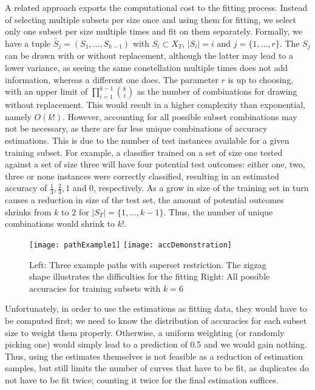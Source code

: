 A related approach exports the computational cost to the fitting process. Instead of selecting multiple subsets per size once and using them for fitting, we select only one subset per size multiple times and fit on them separately. Formally, we have a tuple $\tilde{S_j} = (S_1,...,S_{k-1})$ with $S_i \subset X_T$, $|S_i| = i$ and $j = \{1,...,r\}$. The $S_j$ can be drawn with or without replacement, although the latter may lead to a lower variance, as seeing the same constellation multiple times does not add information, whereas a different one does. The parameter $r$ is up to choosing, with an upper limit of $\prod_{i=1}^{k-1} {k \choose i}$ as the number of combinations for drawing without replacement. This would result in a higher complexity than exponential, namely $O(k!)$. However, accounting for all possible subset combinations may not be necessary, as there are far less unique combinations of accuracy estimations. This is due to the number of test instances available for a given training subset. For example, a classifier trained on a set of size one tested against a set of size three will have four potential test outcomes: either one, two, three or none instances were correctly classified, resulting in an estimated accuracy of $\frac{1}{3}, \frac{2}{3}, 1$ and $0$, respectively. As a grow in size of the training set in turn causes a reduction in size of the test set, the amount of potential outcomes shrinks from $k$ to $2$ for $|S_T| = \{1, ..., k-1\}$. Thus, the number of unique combinations would shrink to $k!$.

\begin{figure}[h]
	\centering
	\texttt{[image: pathExample1]}
	\texttt{[image: accDemonstration]}
	\caption{Left: Three example paths with superset restriction. The zigzag shape illustrates the difficulties for the fitting\newline
Right: All possible accuracies for training subsets with $k = 6$}
	\label{fig:pathAccExamples}
\end{figure}

Unfortunately, in order to use the estimations as fitting data, they would have to be computed first; we need to know the distribution of accuracies for each subset size to weight them properly. Otherwise, a uniform weighting (or randomly picking one) would simply lead to a prediction of 0.5 and we would gain nothing. Thus, using the estimates themselves is not feasible as a reduction of estimation samples, but still limits the number of curves that have to be fit, as duplicates do not have to be fit twice; counting it twice for the final estimation suffices.

